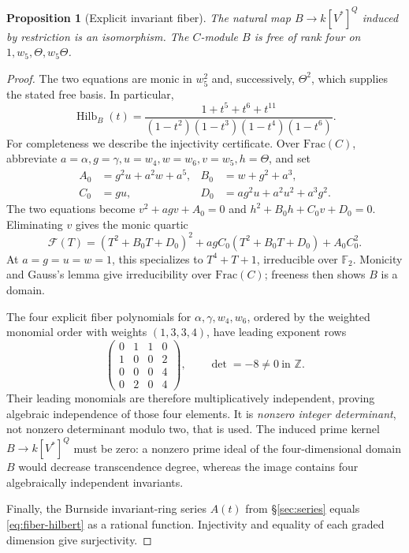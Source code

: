 \documentclass[11pt,a4paper]{article}
\newtheorem{proposition}[theorem]{Proposition}
\theoremstyle{remark}\newtheorem{remark}[theorem]{Remark}
\newcommand{\F}{\mathbb F}
\newcommand{\Z}{\mathbb Z}
\newcommand{\Hilb}{\operatorname{Hilb}}
\begin{document}
\begin{proposition}[Explicit invariant fiber]\label{prop:fiber}
The natural map \(B\to k[V^*]^Q\) induced by restriction is an isomorphism. The \(C\)-module \(B\) is free of rank four on \(1,w_5,\Theta,w_5\Theta\).
\end{proposition}
\begin{proof}
The two equations are monic in \(w_5^2\) and, successively, \(\Theta^2\), which supplies the stated free basis. In particular,
\begin{equation}\label{eq:fiber-hilbert}
\Hilb_B(t)=\frac{1+t^5+t^6+t^{11}}
{(1-t^2)(1-t^3)(1-t^4)(1-t^6)}.
\end{equation}
For completeness we describe the injectivity certificate. Over \(\mathrm{Frac}(C)\), abbreviate \(a=\alpha,g=\gamma,u=w_4,w=w_6,v=w_5,h=\Theta\), and set
\begin{align*}
A_0&=g^2u+a^2w+a^5,&B_0&=w+g^2+a^3,\\
C_0&=gu,&D_0&=ag^2u+a^2u^2+a^3g^2.
\end{align*}
The two equations become \(v^2+agv+A_0=0\) and \(h^2+B_0h+C_0v+D_0=0\). Eliminating \(v\) gives the monic quartic
\[
\mathcal F(T)=(T^2+B_0T+D_0)^2+agC_0(T^2+B_0T+D_0)+A_0C_0^2.
\]
At \(a=g=u=w=1\), this specializes to \(T^4+T+1\), irreducible over \(\F_2\). Monicity and Gauss's lemma give irreducibility over \(\mathrm{Frac}(C)\); freeness then shows \(B\) is a domain.

The four explicit fiber polynomials for \(\alpha,\gamma,w_4,w_6\), ordered by the weighted monomial order with weights \((1,3,3,4)\), have leading exponent rows
\[
\begin{pmatrix}0&1&1&0\\1&0&0&2\\0&0&0&4\\0&2&0&4\end{pmatrix},
\qquad \det=-8\ne0\ \text{in }\Z.
\]
Their leading monomials are therefore multiplicatively independent, proving algebraic independence of those four elements. It is \emph{nonzero integer determinant}, not nonzero determinant modulo two, that is used. The induced prime kernel \(B\to k[V^*]^Q\) must be zero: a nonzero prime ideal of the four-dimensional domain \(B\) would decrease transcendence degree, whereas the image contains four algebraically independent invariants.

Finally, the Burnside invariant-ring series \(A(t)\) from \S\ref{sec:series} equals \eqref{eq:fiber-hilbert} as a rational function. Injectivity and equality of each graded dimension give surjectivity.
\end{proof}
\end{document}
